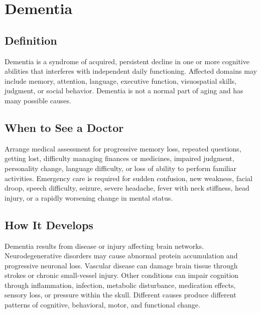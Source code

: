 \chapter{Dementia}

\section*{Definition}
Dementia is a syndrome of acquired, persistent decline in one or more cognitive abilities that interferes with independent daily functioning. Affected domains may include memory, attention, language, executive function, visuospatial skills, judgment, or social behavior. Dementia is not a normal part of aging and has many possible causes.

\section*{When to See a Doctor}
Arrange medical assessment for progressive memory loss, repeated questions, getting lost, difficulty managing finances or medicines, impaired judgment, personality change, language difficulty, or loss of ability to perform familiar activities. Emergency care is required for sudden confusion, new weakness, facial droop, speech difficulty, seizure, severe headache, fever with neck stiffness, head injury, or a rapidly worsening change in mental status.

\section*{How It Develops}
Dementia results from disease or injury affecting brain networks. Neurodegenerative disorders may cause abnormal protein accumulation and progressive neuronal loss. Vascular disease can damage brain tissue through strokes or chronic small-vessel injury. Other conditions can impair cognition through inflammation, infection, metabolic disturbance, medication effects, sensory loss, or pressure within the skull. Different causes produce different patterns of cognitive, behavioral, motor, and functional change.

